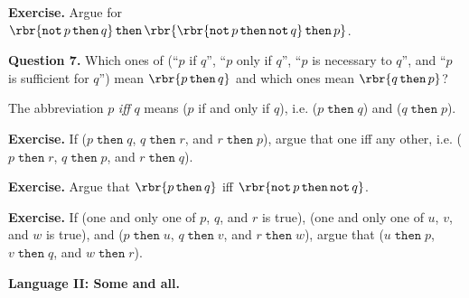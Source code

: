 \documentclass[oneside,12pt]{article}
\def\opthen{\mathop{\mathtt{then}}}
\def\opnot{\mathop{\mathtt{not}}}
\begin{document}
\hspace{-0.75in}\llap{> } \textbf{Exercise.} Argue for $ \rbr{ \opnot p \opthen q } \opthen \rbr{ \rbr{ \opnot p \opthen \opnot q } \opthen p } $.

\leavevmode

\hspace{-0.75in} \textbf{Question 7.} Which ones of (``$p$ if $q$'', ``$p$ only if $q$'', ``$p$ is necessary to $q$'', and ``$p$ is sufficient for $q$'') mean $ \rbr{ p \opthen q } $ and which ones mean $ \rbr{ q \opthen p } $?

\leavevmode

The abbreviation $p$ \emph{iff} $q$ means ($p$ if and only if $q$), i.e. ($ p \opthen q $) and ($ q \opthen p $).

\leavevmode

\hspace{-0.75in}\llap{> } \textbf{Exercise.} If ($ p \opthen q $, $ q \opthen r $, and $ r \opthen p $), argue that one iff any other, i.e. ($ p \opthen r $, $ q \opthen p $, and $ r \opthen q $).

\hspace{-0.75in}\llap{> } \textbf{Exercise.} Argue that $ \rbr{ p \opthen q } $ iff $ \rbr{ \opnot p \opthen \opnot q } $.

\hspace{-0.75in}\llap{> } \textbf{Exercise.} If (one and only one of $p$, $q$, and $r$ is true), (one and only one of $u$, $v$, and $w$ is true), and ($ p \opthen u $, $ q \opthen v $, and $ r \opthen w $), argue that ($ u \opthen p $, $ v \opthen q $, and $ w \opthen r $).

\newpage

\hspace{-0.75in} \textbf{Language II: Some and all.}

\leavevmode
\end{document}
